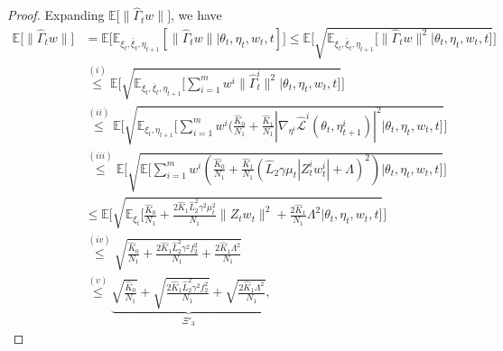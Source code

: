 \documentclass[twoside]{article} %
\theoremstyle{plain}
\theoremstyle{definition}
\theoremstyle{remark}
\newcommand{\HGamma}{\hat{\Gamma}}
\newcommand{\HUpsilon}{\hat{\Upsilon}}
\newcommand{\hL}{\hat{L}}
\newcommand{\fhL}{\hat{\mathcal{L}}}
\begin{document}
\begin{proof}
    Expanding $\mathbb{E}\big[\|\HGamma_{t}w\|\big]$, we have
    \begin{align}
        \mathbb{E}\big[\|\HGamma_{t}w\|\big]&=\mathbb{E}\big[\mathbb{E}_{\xi_t,\bar{\xi}_t,\eta_{t+1}}[\| \HGamma_tw\||\theta_t,\eta_t,w_t,t]\big]\leq \mathbb{E}\big[\sqrt{\mathbb{E}_{\xi_t,\bar{\xi}_t,\eta_{t+1}}\big[\|\HGamma_{t}w\|^2 |\theta_t,\eta_t,w_t,t\big]}\big]\nonumber\\
        &\overset{(i)}{\leq} \mathbb{E}\Big[\sqrt{\mathbb{E}_{\xi_t,\bar{\xi}_t,\eta_{t+1}}\big[\sum_{i=1}^{m}w^i\|\HGamma_{t}^i\|^2|\theta_t,\eta_t,w_t,t\big]}\Big]\nonumber\\
        &\overset{(ii)}{\leq}\mathbb{E}\Big[ \sqrt{\mathbb{E}_{\xi_t,\eta_{t+1}}\big[\sum_{i=1}^{m}w^i(\frac{\hat{K}_0}{N_1}+\frac{\hat{K}_1}{N_1}|\nabla_{\eta^i}\fhL^i(\theta_t, \eta_{t+1}^i)|^2|\theta_t,\eta_t,w_t,t\big]}\Big]\nonumber\\
        &\overset{(iii)}{\leq} \mathbb{E}\Big[\sqrt{\mathbb{E}\big[\sum_{i=1}^{m}w^i(\frac{\hat{K}_0}{N_1}+\frac{\hat{K}_1}{N_1}(\hL_2\gamma\mu_t|Z_t^iw_t^i|+\Lambda)^2)|\theta_t,\eta_t,w_t,t\big]}\Big]\nonumber\\
        &\overset{}{\leq} \mathbb{E}\Big[\sqrt{\mathbb{E}_{\xi_t}\big[\frac{\hat{K}_0}{N_1}+\frac{2\hat{K}_1\hL_2^2\gamma^2\mu_t^2}{N_1}\|Z_tw_t\|^2+\frac{2\hat{K}_1}{N_1}\Lambda^2|\theta_t,\eta_t,w_t,t\big]}\Big]\nonumber\\
        &\overset{(iv)}{\leq} \sqrt{\frac{\hat{K}_0}{N_1}+\frac{2\hat{K}_1\hL_2^2\gamma^2f_2^2}{N_1}+\frac{2\hat{K}_1\Lambda^2}{N_1}}\nonumber\\
        &\overset{(v)}{\leq} \underbrace{\sqrt{\frac{\hat{K}_0}{N_1}}+\sqrt{\frac{2\hat{K}_1\hL_2^2\gamma^2f_2^2}{N_1}}+\sqrt{\frac{2\hat{K}_1\Lambda^2}{N_1}}}_{\Xi'_3},

\end{align}
\end{proof}
\end{document}
